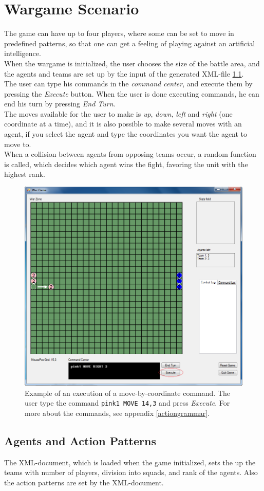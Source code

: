 \section{Wargame Scenario}
\label{sec:wargame}

The game can have up to four players, where some can be set to move in predefined patterns, so that one can get a feeling of playing against an artificial intelligence.\\
	When the wargame is initialized, the user chooses the size of the battle area, and the agents and teams are set up by the input of the generated XML-file \ref{agents_patterns}.\\
	The user can type his commands in the \textit{command center}, and execute them by pressing the \textit{Execute} button. When the user is done executing commands, he can end his turn by pressing \textit{End Turn}.\\
	The moves available for the user to make is \textit{up}, \textit{down}, \textit{left} and \textit{right} (one coordinate at a time), and it is also possible to make several moves with an agent, if you select the agent and type the coordinates you want the agent to move to.\\
  When a collision between agents from opposing teams occur, a random function is called, which decides which agent wins the fight, favoring the unit with the highest rank.
	
\begin{figure}[H]
\begin{center}
\includegraphics[scale=0.6]{Images/ex_com.png}
\end{center}
\caption{Example of an execution of a move-by-coordinate command. The user type the command \texttt{pink1 MOVE 14,3} and press \textit{Execute}. For more about the commands, see appendix \ref{actiongrammar}.}
\label{fig:ex_com}
\end{figure}

\subsection{Agents and Action Patterns}
\label{agents_patterns}

The XML-document, which is loaded when the game initialized, sets the up the teams with number of players, division into squads, and rank of the agents. Also the action patterns are set by the XML-document.